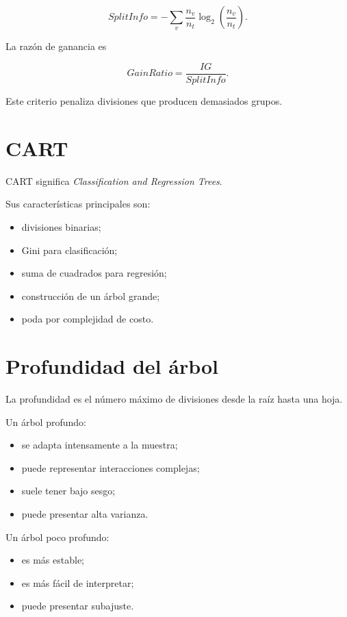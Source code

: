 \documentclass[
  spanish,
  11pt,
  letterpaper,
  DIV=11,
  numbers=noendperiod]{scrreprt}
\providecommand{\tightlist}{%
  \setlength{\itemsep}{0pt}\setlength{\parskip}{0pt}}
\theoremstyle{definition}
\theoremstyle{plain}
\theoremstyle{definition}
\theoremstyle{remark}
\begin{document}
\[
SplitInfo
=
-
\sum_v
\frac{n_v}{n_t}
\log_2
\left(
\frac{n_v}{n_t}
\right).
\]

La razón de ganancia es

\[
GainRatio
=
\frac{IG}{SplitInfo}.
\]

Este criterio penaliza divisiones que producen demasiados grupos.

\section{CART}\label{cart}

CART significa \emph{Classification and Regression Trees}.

Sus características principales son:

\begin{itemize}
\tightlist
\item
  divisiones binarias;
\item
  Gini para clasificación;
\item
  suma de cuadrados para regresión;
\item
  construcción de un árbol grande;
\item
  poda por complejidad de costo.
\end{itemize}

\section{Profundidad del árbol}\label{profundidad-del-uxe1rbol}

La profundidad es el número máximo de divisiones desde la raíz hasta una
hoja.

Un árbol profundo:

\begin{itemize}
\tightlist
\item
  se adapta intensamente a la muestra;
\item
  puede representar interacciones complejas;
\item
  suele tener bajo sesgo;
\item
  puede presentar alta varianza.
\end{itemize}

Un árbol poco profundo:

\begin{itemize}
\tightlist
\item
  es más estable;
\item
  es más fácil de interpretar;
\item
  puede presentar subajuste.
\end{itemize}
\end{document}
